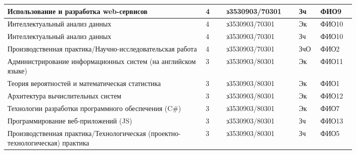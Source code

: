 \begin{table}[htbp]
\begin{tabular}{|p{0.48\linewidth}|p{0.05\linewidth}|p{0.16\linewidth}|p{0.04\linewidth}|p{0.08\linewidth}|}
		Использование и разработка web-сервисов                                       & 4                                                & з3530903/70301                                     & Зч                                                         & ФИО9          \\	\hline
		Интеллектуальный анализ данных                                                & 4                                                & з3530903/70301                                     & Эк                                                         & ФИО10         \\ 	\hline
		Интеллектуальный анализ данных                                                & 4                                                & з3530903/70301                                     & Зч                                                         & ФИО10         \\ 	\hline
		Производственная практика/Научно-исследовательская работа                     & 4                                                & з3530903/70301                                     & ЗчО                                                        & ФИО2          \\	\hline
		Администрирование информационных систем (на английском языке)                 & 3                                                & з3530903/80301                                     & Эк                                                         & ФИО11         \\	\hline
		Теория вероятностей и математическая статистика                               & 3                                                & з3530903/80301                                     & Эк                                                         & ФИО1          \\	\hline
		Архитектура вычислительных систем                                             & 3                                                & з3530903/80301                                     & Эк                                                         & ФИО12         \\
		Технологии разработки программного обеспечения (C\#)                          & 3                                                & з3530903/80301                                     & Эк                                                         & ФИО7          \\	\hline
		Программирование веб-приложений (JS)                                          & 3                                                & з3530903/80301                                     & Зч                                                         & ФИО13         \\	\hline
		Производственная практика/Технологическая (проектно-технологическая) практика & 3                                                & з3530903/80301                                     & Зч                                                         & ФИО5  \\	\hline       
	\end{tabular} \label{table:plan}
\end{table} 

